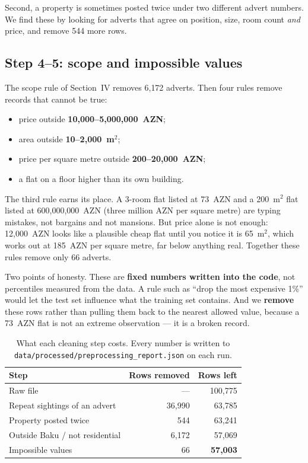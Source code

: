 \documentclass[10pt,twocolumn,a4paper]{article}
\begin{document}
Second, a property is sometimes posted twice under two different advert
numbers. We find these by looking for adverts that agree on position,
size, room count \emph{and} price, and remove 544 more rows.

\subsection{Step 4--5: scope and impossible values}

The scope rule of Section~IV removes 6{,}172 adverts. Then four rules
remove records that cannot be true:

\begin{itemize}\itemsep2pt
  \item price outside \textbf{10{,}000--5{,}000{,}000~AZN};
  \item area outside \textbf{10--2{,}000~m$^2$};
  \item price per square metre outside \textbf{200--20{,}000~AZN};
  \item a flat on a floor higher than its own building.
\end{itemize}

The third rule earns its place. A 3-room flat listed at 73~AZN and a
200~m$^2$ flat listed at 600{,}000{,}000~AZN (three million AZN per square
metre) are typing mistakes, not bargains and not mansions. But price
alone is not enough: 12{,}000~AZN looks like a plausible cheap flat until
you notice it is 65~m$^2$, which works out at 185~AZN per square metre, far
below anything real. Together these rules remove only 66 adverts.

Two points of honesty. These are \textbf{fixed numbers written into the
code}, not percentiles measured from the data. A rule such as ``drop the
most expensive 1\%'' would let the test set influence what the training
set contains. And we \textbf{remove} these rows rather than pulling them
back to the nearest allowed value, because a 73~AZN flat is not an
extreme observation --- it is a broken record.

\begin{table}[t]
  \centering
  \caption{What each cleaning step costs. Every number is written to
  \texttt{data/processed/preprocessing\_report.json} on each run.}
  \label{tab:rows}
  \small
  \begin{tabular}{@{}lrr@{}}
    \toprule
    Step & Rows removed & Rows left \\
    \midrule
    Raw file                       & ---     & 100{,}775 \\
    Repeat sightings of an advert  & 36{,}990 & 63{,}785 \\
    Property posted twice          & 544     & 63{,}241 \\
    Outside Baku / not residential & 6{,}172  & 57{,}069 \\
    Impossible values              & 66      & \textbf{57{,}003} \\
    \bottomrule
  \end{tabular}
\end{table}
\end{document}

